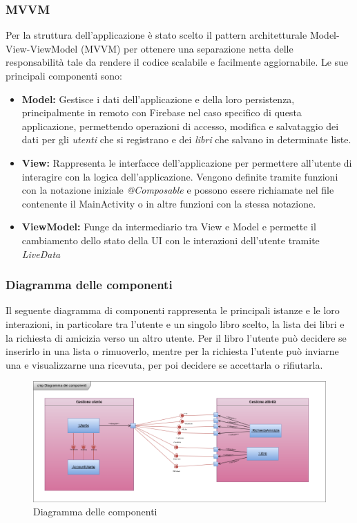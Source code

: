 \documentclass{article}
\begin{document}
\subsubsection{MVVM}

Per la struttura dell'applicazione è stato scelto il pattern architetturale Model-View-ViewModel (MVVM) per ottenere
una separazione netta delle responsabilità tale da rendere il codice scalabile e facilmente aggiornabile.
Le sue principali componenti sono:
\begin{itemize}
  \item \textbf{Model:} Gestisce i dati dell'applicazione e della loro persistenza, principalmente in remoto con Firebase nel caso specifico di questa applicazione, 
  permettendo operazioni di accesso, modifica e salvataggio dei dati per gli \textit{utenti} che si registrano e dei \textit{libri} che salvano in determinate liste. 
  \item \textbf{View:} Rappresenta le interfacce dell'applicazione per permettere all'utente di interagire con la logica dell'applicazione. 
  Vengono definite tramite funzioni con la notazione iniziale \textit{@Composable} e possono essere richiamate nel file contenente il MainActivity o in altre funzioni con la stessa notazione.
  \item \textbf{ViewModel:} Funge da intermediario tra View e Model e permette il cambiamento dello stato della UI con le interazioni dell'utente tramite \textit{LiveData}
\end{itemize}

\subsubsection{Diagramma delle componenti}

Il seguente diagramma di componenti rappresenta le principali istanze e le loro interazioni, in particolare tra l'utente e un singolo libro scelto, la lista dei libri e la richiesta di amicizia verso un altro utente.
Per il libro l'utente può decidere se inserirlo in una lista o rimuoverlo, mentre per la richiesta l'utente può inviarne una e visualizzarne una ricevuta, per poi decidere se accettarla o rifiutarla.

\begin{figure}[H]
  \centering
  \includegraphics[width=1\linewidth]{diagramma_componenti.png}
  \caption{Diagramma delle componenti}
  \label{fig:sitemap}
\end{figure}
\end{document}
